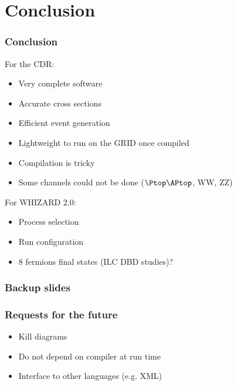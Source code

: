 \documentclass{beamer}
\newcommand{\whizard}{WHIZARD\xspace}
\begin{document}
\section{Conclusion}
\begin{frame}
\frametitle{Conclusion}
For the CDR:
\begin{itemize}
  \item Very complete software
  \item Accurate cross sections
  \item Efficient event generation
  \item Lightweight to run on the GRID once compiled
  \item Compilation is tricky
  \item Some channels could not be done ($\Ptop\APtop$, WW, ZZ)
\end{itemize}
For \whizard 2.0:
\begin{itemize}
  \item Process selection
  \item Run configuration
  \item 8 fermions final states (ILC DBD studies)?
\end{itemize}
\end{frame}

\appendix
\begin{frame} 
\frametitle{Backup slides}
\end{frame}
\begin{frame}
\frametitle{Requests for the future}
\begin{itemize}
  \item Kill diagrams
  \item Do not depend on compiler at run time
  \item Interface to other languages (e.g. XML)
\end{itemize}
\end{frame}
\end{document}
